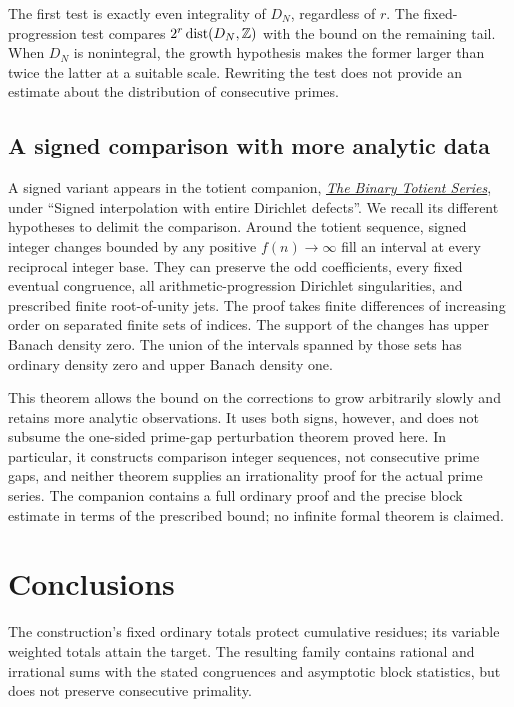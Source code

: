 \documentclass[11pt]{article}
\begin{document}
The first test is exactly even integrality of $D_N$, regardless of $r$.
The fixed-progression test compares $2^r\operatorname{dist}(D_N,\mathbb{Z})$
with the bound on the remaining tail.  When $D_N$ is nonintegral, the
growth hypothesis makes the former larger than twice the latter at a
suitable scale.  Rewriting the
test does not provide an estimate about the distribution of consecutive primes.

\subsection{A signed comparison with more analytic data}
\label{long251:sec:signed-dirichlet-comparison}
A signed variant appears in the totient companion,
\href{erdos249-totient-reasoning-surface.pdf}{\emph{The Binary Totient Series}},
under ``Signed interpolation with entire Dirichlet defects''.
We recall its different hypotheses to delimit the comparison. Around the totient sequence,
signed integer changes bounded by any positive $f(n)\to\infty$ fill an
interval at every reciprocal integer base. They can preserve the odd
coefficients, every fixed eventual congruence, all arithmetic-progression
Dirichlet singularities, and prescribed finite root-of-unity jets. The
proof takes finite differences of increasing order on separated finite
sets of indices.  The support of the changes has upper Banach density
zero.  The union of the intervals spanned by those sets has ordinary
density zero and upper Banach density one.

This theorem allows the bound on the corrections to grow arbitrarily slowly and retains more
analytic observations. It uses both signs, however, and does not subsume
the one-sided prime-gap perturbation theorem proved here. In particular,
it constructs comparison integer sequences, not consecutive prime gaps,
and neither theorem supplies an irrationality proof for the actual prime
series. The companion contains a full ordinary proof and the precise
block estimate in terms of the prescribed bound; no infinite formal theorem is claimed.

\section{Conclusions}\label{sec:erdos-251-complete-family-map}
The construction's fixed ordinary totals protect cumulative residues;
its variable weighted totals attain the target.  The resulting family
contains rational and irrational sums with the stated congruences and
asymptotic block statistics, but does not preserve consecutive primality.
\end{document}

